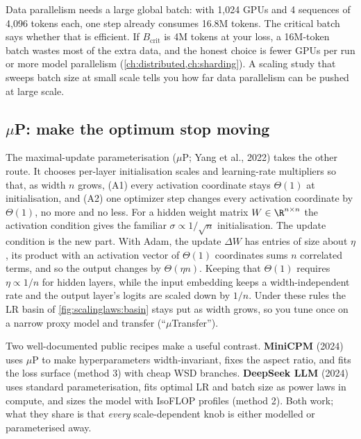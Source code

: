 \begin{systemslens}
Data parallelism needs a large global batch: with 1{,}024 GPUs and 4 sequences of 4{,}096 tokens
each, one step already consumes 16.8M tokens. The critical batch says whether that is
efficient. If $B_{\text{crit}}$ is 4M tokens at your loss, a 16M-token batch wastes most of
the extra data, and the honest choice is fewer GPUs per run or more model parallelism
(\cref{ch:distributed,ch:sharding}). A scaling study that sweeps batch size at small scale tells
you how far data parallelism can be pushed at large scale.
\end{systemslens}

\subsection{\texorpdfstring{$\mu$P}{muP}: make the optimum stop moving}\label{sec:scalinglaws:mup}

The maximal-update parameterisation ($\mu$P; Yang et al., 2022) takes the other route. It
chooses per-layer initialisation scales and learning-rate multipliers so that, as width $n$ grows,
(A1) every activation coordinate stays $\Theta(1)$ at initialisation, and (A2) one optimizer
step changes every activation coordinate by $\Theta(1)$, no more and no less. For a hidden
weight matrix $W\in\R^{n\times n}$ the activation condition gives the familiar
$\sigma\propto1/\sqrt{n}$ initialisation. The update condition is the new part. With Adam,
the update $\Delta W$ has entries of size about $\eta$, its product with an activation
vector of $\Theta(1)$ coordinates sums $n$ correlated terms, and so the output changes by
$\Theta(\eta n)$. Keeping that $\Theta(1)$ requires $\eta\propto 1/n$ for hidden layers, while
the input embedding keeps a width-independent rate and the output layer's logits are scaled down
by $1/n$. Under these rules the LR basin of \cref{fig:scalinglaws:basin} stays put as width
grows, so you tune once on a narrow proxy model and transfer (``$\mu$Transfer'').

\begin{keyidea}
Two well-documented public recipes make a useful contrast. \textbf{MiniCPM} (2024) uses
$\mu$P to make hyperparameters width-invariant, fixes the aspect ratio, and fits the
loss surface (method 3) with cheap WSD branches. \textbf{DeepSeek LLM} (2024) uses standard
parameterisation, fits optimal LR and batch size as power laws in compute, and sizes the model
with IsoFLOP profiles (method 2). Both work; what they share is that \emph{every}
scale-dependent knob is either modelled or parameterised away.
\end{keyidea}

